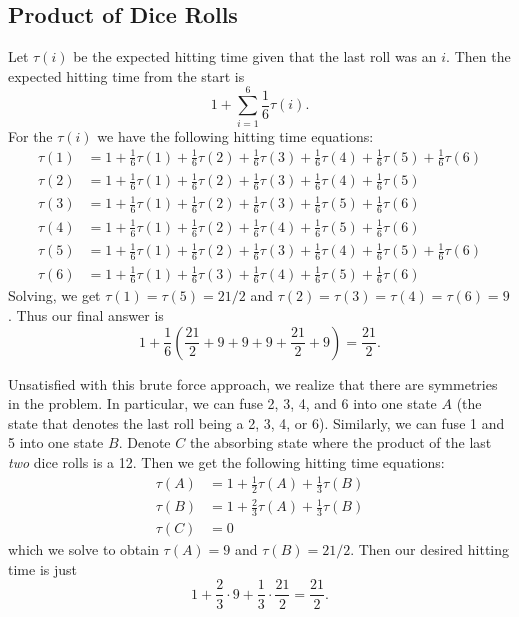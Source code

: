 \subsection{Product of Dice Rolls}
Let $\tau(i)$ be the expected hitting time given that the last roll was an $i$. Then the expected hitting time from the start is 
\[
1 + \sum_{i = 1}^6\frac{1}{6}\tau(i).
\]
For the $\tau(i)$ we have the following hitting time equations:
\begin{align*}
    \tau(1) &= 1 + \frac{1}{6}\tau(1) + \frac{1}{6}\tau(2) + \frac{1}{6}\tau(3) + \frac{1}{6}\tau(4) + \frac{1}{6}\tau(5) + \frac{1}{6}\tau(6) \\
    \tau(2) &= 1 + \frac{1}{6}\tau(1) + \frac{1}{6}\tau(2) + \frac{1}{6}\tau(3) + \frac{1}{6}\tau(4) + \frac{1}{6}\tau(5) \\
    \tau(3) &= 1 + \frac{1}{6}\tau(1) + \frac{1}{6}\tau(2) + \frac{1}{6}\tau(3) + \frac{1}{6}\tau(5) + \frac{1}{6}\tau(6) \\
    \tau(4) &= 1 + \frac{1}{6}\tau(1) + \frac{1}{6}\tau(2) + \frac{1}{6}\tau(4) + \frac{1}{6}\tau(5) + \frac{1}{6}\tau(6) \\
    \tau(5) &= 1 + \frac{1}{6}\tau(1) + \frac{1}{6}\tau(2) + \frac{1}{6}\tau(3) + \frac{1}{6}\tau(4) + \frac{1}{6}\tau(5) + \frac{1}{6}\tau(6) \\
    \tau(6) &= 1 + \frac{1}{6}\tau(1) + \frac{1}{6}\tau(3) + \frac{1}{6}\tau(4) + \frac{1}{6}\tau(5) + \frac{1}{6}\tau(6)
\end{align*}
Solving, we get $\tau(1) = \tau(5) = 21/2$ and $\tau(2) = \tau(3) = \tau(4) = \tau(6) = 9$. Thus our final answer is
\[
1 + \frac{1}{6}\left(\frac{21}{2} + 9 + 9 + 9 + \frac{21}{2} + 9\right) = \frac{21}{2}.
\]

Unsatisfied with this brute force approach, we realize that there are symmetries in the problem. In particular, we can fuse 2, 3, 4, and 6 into one state $A$ (the state that denotes the last roll being a 2, 3, 4, or 6). Similarly, we can fuse 1 and 5 into one state $B$. Denote $C$ the absorbing state where the product of the last \textit{two} dice rolls is a 12. Then we get the following hitting time equations:
\begin{align*}
    \tau(A) &= 1 + \frac{1}{2}\tau(A) + \frac{1}{3}\tau(B) \\
    \tau(B) &= 1 + \frac{2}{3}\tau(A) + \frac{1}{3}\tau(B) \\
    \tau(C) &= 0
\end{align*}
which we solve to obtain $\tau(A) = 9$ and $\tau(B) = 21/2$. Then our desired hitting time is just
\[
1 + \frac{2}{3} \cdot 9 + \frac{1}{3} \cdot \frac{21}{2} = \frac{21}{2}.
\]

